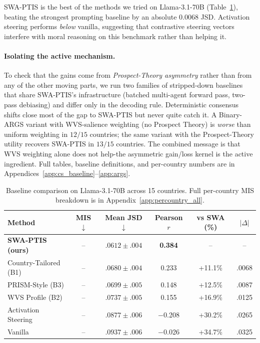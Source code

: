 \documentclass{article}
\begin{document}
SWA-PTIS is the best of the methods we tried on Llama-3.1-70B
(Table~\ref{tab:baselines}), beating the strongest prompting baseline by an
absolute $0.0068$ JSD. Activation steering performs \emph{below} vanilla,
suggesting that contrastive steering vectors interfere with moral reasoning
on this benchmark rather than helping it.

\paragraph{Isolating the active mechanism.}
To check that the gains come from \emph{Prospect-Theory asymmetry} rather than
from any of the other moving parts, we run two families of stripped-down
baselines that share SWA-PTIS's infrastructure (batched multi-agent forward
pass, two-pass debiasing) and differ only in the decoding rule. Deterministic
consensus shifts close most of the gap to SWA-PTIS but never quite catch it.
A Binary-ARGS variant with WVS-salience weighting (no Prospect Theory) is
\emph{worse} than uniform weighting in $12/15$ countries; the same variant
with the Prospect-Theory utility recovers SWA-PTIS in $13/15$ countries. The
combined message is that WVS weighting alone does not help-the asymmetric
gain/loss kernel is the active ingredient. Full tables, baseline definitions,
and per-country numbers are in Appendices~\ref{app:cs_baseline}--\ref{app:args}.

\begin{table}[t]
\caption{Baseline comparison on Llama-3.1-70B across 15 countries. Full
per-country MIS breakdown is in Appendix~\ref{app:percountry_all}.}
\label{tab:baselines}
\centering\small
\begin{tabular}{lccccc}
\toprule
Method & MIS $\downarrow$ & Mean JSD $\downarrow$ & Pearson $r$ & vs SWA (\%) & $|\Delta|$ \\
\midrule
\textbf{SWA-PTIS (ours)} & -- & $\mathbf{.0612 \pm.004}$ & \textbf{0.384} & -- & -- \\
Country-Tailored (B1) & -- & $.0680 \pm.004$ & 0.233 & +11.1\% & .0068 \\
PRISM-Style (B3) & -- & $.0699 \pm.005$ & 0.148 & +12.5\% & .0087 \\
WVS Profile (B2) & -- & $.0737 \pm.005$ & 0.155 & +16.9\% & .0125 \\
Activation Steering & -- & $.0877 \pm.006$ & $-$0.208 & +30.2\% & .0265 \\
Vanilla & -- & $.0937 \pm.006$ & $-$0.026 & +34.7\% & .0325 \\
\bottomrule
\end{tabular}
\end{table}
\end{document}
